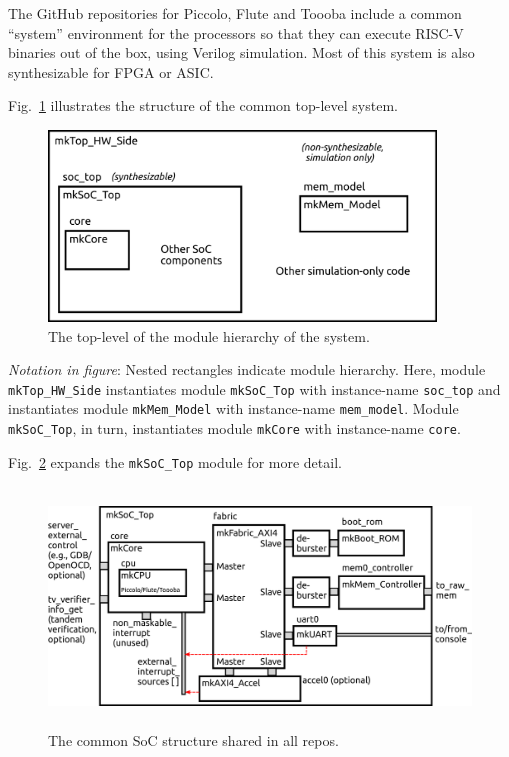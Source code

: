 \documentclass[11pt]{book}
\newcommand{\cf}{\footnotesize\tt}
\begin{document}
The GitHub repositories for Piccolo, Flute and Toooba include a common
``system'' environment for the processors so that they can execute
RISC-V binaries out of the box, using Verilog simulation.  Most of
this system is also synthesizable for FPGA or ASIC.

Fig.~\ref{Fig_100_Top_HW_Side} illustrates the structure of the common
top-level system.
\begin{figure}[htbp]
  \centerline{\includegraphics[height=2in,angle=0]{Figures/Fig_100_Top_HW_Side.png}}
  \caption{\label{Fig_100_Top_HW_Side}The top-level of the module hierarchy of the system.}
\end{figure}

\emph{Notation in figure}: Nested rectangles indicate module
hierarchy.  Here, module {\cf mkTop\_HW\_Side} instantiates module
{\cf mkSoC\_Top} with instance-name {\cf soc\_top} and instantiates
module {\cf mkMem\_Model} with instance-name {\cf mem\_model}.  Module
{\cf mkSoC\_Top}, in turn, instantiates module {\cf mkCore} with
instance-name {\cf core}.

Fig.~\ref{Fig_200_SoC_Top} expands the {\cf mkSoC\_Top} module for more detail.
\begin{figure}[htbp]
  \centerline{\includegraphics[height=2.5in,angle=0]{Figures/Fig_200_SoC_Top.png}}
  \caption{\label{Fig_200_SoC_Top}The common SoC structure shared in all repos.}
\end{figure}
\end{document}
